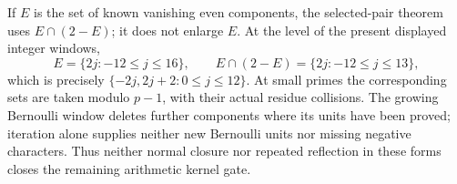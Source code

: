 If \(E\) is the set of known vanishing even components, the
selected-pair theorem uses \(E\cap(2-E)\); it does not enlarge
\(E\). At the level of the present displayed integer windows,
\[
 E=\{2j:-12\le j\le16\},\qquad
 E\cap(2-E)=\{2j:-12\le j\le13\},
\]
which is precisely \(\{-2j,2j+2:0\le j\le12\}\).
At small primes the corresponding sets are taken modulo \(p-1\),
with their actual residue collisions. The growing Bernoulli window
deletes further components where its units have been proved;
iteration alone supplies neither new Bernoulli units nor missing
negative characters. Thus neither normal closure nor repeated
reflection in these forms closes the remaining arithmetic kernel
gate.
